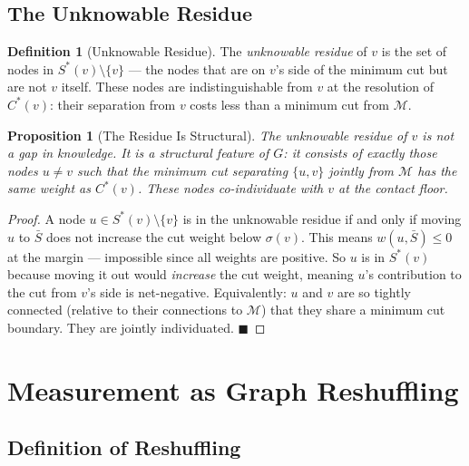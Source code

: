 \documentclass[11pt,twocolumn,a4paper]{article}
\theoremstyle{plain}
\newtheorem{proposition}[theorem]{Proposition}
\theoremstyle{definition}
\newtheorem{definition}[theorem]{Definition}
\theoremstyle{remark}
\newcommand{\med}{\mathcal{M}}
\renewcommand{\qed}{\hfill$\blacksquare$}
\begin{document}
\subsection{The Unknowable Residue}

\begin{definition}[Unknowable Residue]
\label{def:unknowable}
The \emph{unknowable residue} of $v$ is the set of nodes in $S^*(v)
\setminus \{v\}$ --- the nodes that are on $v$'s side of the minimum cut
but are not $v$ itself. These nodes are indistinguishable from $v$ at the
resolution of $C^*(v)$: their separation from $v$ costs less than a minimum
cut from $\med$.
\end{definition}

\begin{proposition}[The Residue Is Structural]
\label{prop:residue}
The unknowable residue of $v$ is not a gap in knowledge. It is a structural
feature of $G$: it consists of exactly those nodes $u \neq v$ such that the
minimum cut separating $\{u, v\}$ jointly from $\med$ has the same weight as
$C^*(v)$. These nodes co-individuate with $v$ at the contact floor.
\end{proposition}

\begin{proof}
A node $u \in S^*(v) \setminus \{v\}$ is in the unknowable residue if and only
if moving $u$ to $\bar{S}$ does not increase the cut weight below $\sigma(v)$.
This means $w(u, \bar{S}) \leq 0$ at the margin --- impossible since all
weights are positive. So $u$ is in $S^*(v)$ because moving it out would
\emph{increase} the cut weight, meaning $u$'s contribution to the cut from
$v$'s side is net-negative. Equivalently: $u$ and $v$ are so tightly connected
(relative to their connections to $\med$) that they share a minimum cut
boundary. They are jointly individuated. \qed
\end{proof}

\section{Measurement as Graph Reshuffling}
\label{sec:reshuffling}

\subsection{Definition of Reshuffling}
\end{document}
